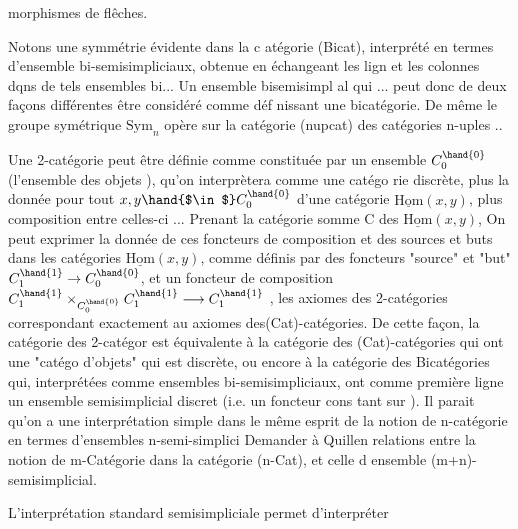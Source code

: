 
morphismes de flêches.

Notons une symmétrie évidente dans la c atégorie (Bicat), interprété
en termes d'ensemble bi-semisimpliciaux, obtenue en échangeant les lign
et les colonnes dqns  de tels ensembles bi... Un ensemble bisemisimpl
al qui ... peut donc de deux façons différentes être considéré comme déf
nissant une bicatégorie. De même le groupe symétrique $\mathrm{Sym}_n$ opère sur
la catégorie  (nupcat) des catégories n-uples ..

Une 2-catégorie peut être définie comme constituée par un ensemble
 $C_0^{\hand{0}}$ (l'ensemble des objets ), qu'on interprètera comme une catégo
rie discrète, plus la donnée pour tout $x,y \hand{$\in$} C_0^{\hand{0}}$ d'une catégorie $\underline{\mathrm{Hom}}(x,y)$,
plus   composition entre celles-ci ... Prenant la catégorie somme  C
des $\underline{\mathrm{Hom}}(x,y)$, On peut exprimer la donnée de ces foncteurs de composition
et des sources et buts dans les catégories $\underline{\mathrm{Hom}}(x,y)$, comme définis par
des foncteurs "source" et "but" $C_{1}^{\hand{1}} \to C_{0}^{\hand{0}}$, et un foncteur de composition
$C_{1}^{\hand{1}} \times_{C_0^{\hand{0}}} C_{1}^{\hand{1}} \longrightarrow C_1^{\hand{1}}$ , les axiomes des 2-catégories correspondant exactement au
axiomes des(Cat)-catégories. De cette façon, la catégorie des 2-catégor
est équivalente à la catégorie des (Cat)-catégories qui ont une "catégo
d'objets" qui est discrète, ou encore à la catégorie des Bicatégories
qui, interprétées comme ensembles bi-semisimpliciaux, ont  comme
première ligne un ensemble semisimplicial discret (i.e. un foncteur cons
tant sur \hand{$\Delta$} ). Il parait qu'on a une interprétation simple dans le même
esprit de la notion de n-catégorie en termes d'ensembles n-semi-simplici
\margin{$\|$}  Demander à Quillen relations entre la notion de m-Catégorie dans
\margin{$\|$} la catégorie (n-Cat), et celle d ensemble (m+n)-semisimplicial.
\margin{$\|$} 

L'interprétation standard semisimpliciale permet d'interpréter

